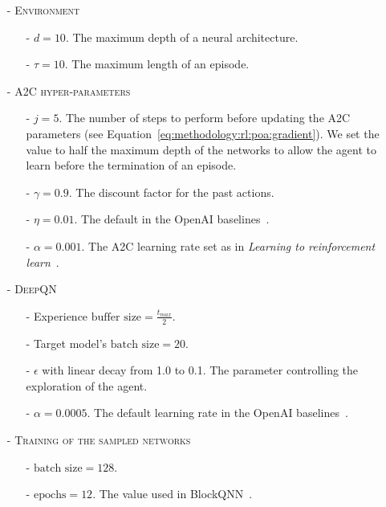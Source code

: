 \begin{itemize}
    \setlength\itemsep{0em}
    \setlength\parskip{0pt}
    \item[-] \textsc{Environment}
        \begin{itemize}
            \setlength\itemsep{0em}
            \item[-]  $d=10$. The maximum depth of a neural architecture.
            \item[-] $\tau=10$. The maximum length of an episode.
        \end{itemize}
    \item[-] \textsc{A2C hyper-parameters}
    \begin{itemize}
        \setlength\itemsep{0em}
        \setlength\parskip{0pt}
        \item[-] $j=5$. The number of steps to perform before updating the A2C parameters (see Equation~\ref{eq:methodology:rl:poa:gradient}). We set the value to half the maximum depth of the networks to allow the agent to learn before the termination of an episode.
        \item[-] $\gamma=0.9$. The discount factor for the past actions.
        \item[-] $\eta=0.01$. The default in the OpenAI baselines~\citep{openaibaselines}.
        \item[-] $\alpha=0.001$. The A2C learning rate set as in \textit{Learning to reinforcement learn}~\citep{LtRL}.
    \end{itemize}
    \item[-] \textsc{DeepQN}
    \begin{itemize}
        \setlength\itemsep{0em}
        \setlength\parskip{0pt}
        \item[-] Experience $\text{buffer size}=\frac{t_{max}}{2}$. 
        \item[-] Target model's $\text{batch size} = 20$.
        \item[-] $\epsilon$ with linear decay from 1.0 to 0.1. The parameter controlling the exploration of the agent.
        \item[-] $\alpha=0.0005$. The default learning rate in the OpenAI baselines~\citep{openaibaselines}.
    \end{itemize}
    \item[-] \textsc{Training of the sampled networks}
    \begin{itemize}
        \setlength\itemsep{0em}
        \setlength\parskip{0pt}
        \item[-] $\text{batch size}=128$.
        \item[-] $\text{epochs}=12$. The value used in BlockQNN~\citep{BlockQNN}.
    \end{itemize}
\end{itemize}


